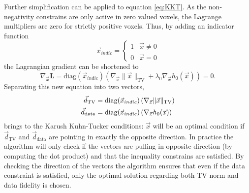 Further simplification can be applied to equation \ref{eq:KKT}. As the non-negativity constrains are only active in zero valued voxels, the Lagrange multipliers are zero for strictly positive voxels. Thus, by adding an indicator function
\begin{equation}
\vec{x}_{indic}=
\begin{cases}
1 & \vec{x} \neq 0 \\
0 & \vec{x} = 0 
\end{cases}
\end{equation}
the Lagrangian gradient can be shortened to
\begin{equation}
\nabla_{\vec{x}}\textbf{L}=\text{diag}(\vec{x}_{indic})\left(\nabla_{\vec{x}}\lVert \vec{x} \rVert_\text{TV}+\lambda_0\nabla_{\vec{x}}h_0(\vec{x})\right)=0 .\label{eq:KKT2}
\end{equation}
Separating this new equation into two vectors,
\begin{align}
\vec{d}_{\text{TV}}&=\text{diag}(\vec{x}_{indic})\left(\nabla_{\vec{x}}\lVert \vec{x} \rVert_\text{TV}\right)\notag\\ 
\vec{d}_{\text{data}}&=\text{diag}(\vec{x}_{indic})\left(\nabla_{\vec{x}}h_0(\vec{x})\right)
\label{eq:KKTvectors}
\end{align}
brings to the Karush Kuhn-Tucker conditions: $\vec{x}$ will be an optimal condition if $\vec{d}_{\text{TV}}$ and $\vec{d}_{\text{data}}$ are pointing in exactly the opposite direction. In practice the algorithm will only check if the vectors are pulling in opposite direction (by computing the dot product) and that the inequality constrains are satisfied. By checking the direction of the vectors the algorithm ensures that even if the data constraint is satisfied, only the optimal solution regarding both TV norm and data fidelity is chosen.


